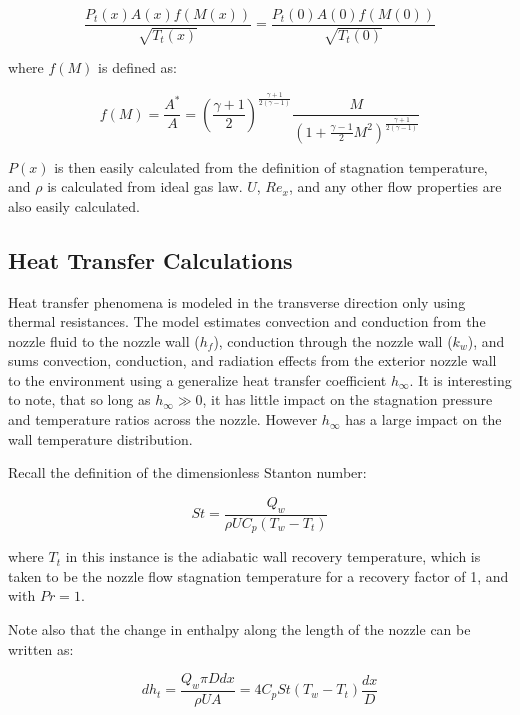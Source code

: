 \documentclass{article}
\begin{document}
\begin{equation}
\label{eq:massConservation}
\frac{P_t(x) A(x) f(M(x))}{\sqrt{T_t(x)}} = \frac{P_t(0) A(0) f(M(0))}{\sqrt{T_t(0)}}
\end{equation}

where $f(M)$ is defined as:

\begin{equation}
\label{eq:area_mach_function}
f(M) = \frac{A^*}{A} = \left( \frac{\gamma + 1}{2} \right)^\frac{\gamma + 1}{2 (\gamma - 1)} \frac{M}{\left(1 + \frac{\gamma - 1}{2} M^2 \right)^\frac{\gamma + 1}{2 (\gamma - 1)}}
\end{equation}

$P(x)$ is then easily calculated from the definition of stagnation temperature, and $\rho$ is calculated from ideal gas law. $U$, $Re_x$, and any other flow properties are also easily calculated.

\subsection{Heat Transfer Calculations}

Heat transfer phenomena is modeled in the transverse direction only using thermal resistances. The model estimates convection and conduction from the nozzle fluid to the nozzle wall ($h_f$), conduction through the nozzle wall ($k_w$), and sums convection, conduction, and radiation effects from the exterior nozzle wall to the environment using a generalize heat transfer coefficient $h_{\infty}$. It is interesting to note, that so long as $h_{\infty} \gg 0$, it has little impact on the stagnation pressure and temperature ratios across the nozzle. However $h_{\infty}$ has a large impact on the wall temperature distribution. 

Recall the definition of the dimensionless Stanton number:

\begin{equation}
\label{eq:stanton_number}
St = \frac{Q_w}{ \rho U C_p (T_w - T_t)}
\end{equation}

where $T_t$ in this instance is the adiabatic wall recovery temperature, which is taken to be the nozzle flow stagnation temperature for a recovery factor of 1, and with $Pr = 1$.

Note also that the change in enthalpy along the length of the nozzle can be written as:

\begin{equation}
\label{eq:change_in_stagnation_enthalpy}
dh_t = \frac{Q_w \pi D dx}{\rho U A} = 4 C_p St (T_w - T_t) \frac{dx}{D}
\end{equation}
\end{document}
